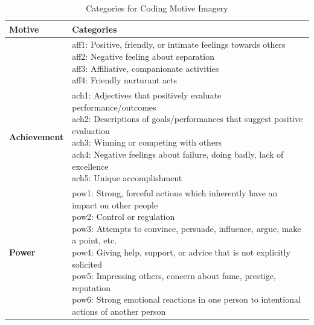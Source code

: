 \documentclass[man,a4paper,mask]{apa6}\usepackage[]{graphicx}\usepackage[]{color}
\begin{document}
\begin{table}
	\caption{Categories for Coding Motive Imagery \parencite{winter_MeasuringPersonalityDistance_1991,winter_ManualScoringMotive_1994}}
	\label{tab:wintercategories}
	\footnotesize
	\centering
	\begin{tabularx}{\textwidth}{lX}
		\toprule
        Motive & Categories \\
			\midrule
		  \adjustbox{valign=t}{\textbf{Affiliation/Intimacy}} & \makecell[l]{aff1: Positive, friendly, or intimate feelings towards others \\aff2: Negative feeling about separation \\aff3: Affiliative, companionate activities \\aff4: Friendly nurturant acts} \\

			\midrule
      \textbf{Achievement} & \makecell[l]{ach1: Adjectives that positively evaluate performance/outcomes \\ach2: Descriptions of goals/performances that suggest positive evaluation \\ach3: Winning or competing with others \\ach4: Negative feelings about failure, doing badly, lack of excellence \\ach5: Unique accomplishment} \\

			\midrule
      \textbf{Power} & \makecell[l]{pow1: Strong, forceful actions which inherently have an impact on other people \\pow2: Control or regulation \\pow3: Attempts to convince, persuade, influence, argue, make a point, etc. \\pow4: Giving help, support, or advice that is not explicitly solicited \\pow5: Impressing others, concern about fame, prestige, reputation \\pow6: Strong emotional reactions in one person to intentional actions of another person} \\
		\bottomrule
	\end{tabularx}
\end{table}
\end{document}
